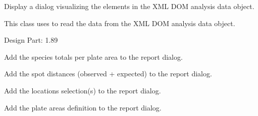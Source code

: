 \documentclass[letterpaper,10pt,english]{sphinxmanual}
\begin{document}
\begin{fulllineitems}
\label{setlyze/gui:setlyze.gui.DisplayReport}
Display a dialog visualizing the elements in the XML DOM analysis
data object.

This class uses {\hyperref[setlyze/std:setlyze.std.ReportReader]{}} to read the data
from the XML DOM analysis data object.

Design Part: 1.89

\begin{fulllineitems}
\label{setlyze/gui:setlyze.gui.DisplayReport.add_area_totals}
Add the species totals per plate area to the report dialog.

\end{fulllineitems}


\begin{fulllineitems}
\label{setlyze/gui:setlyze.gui.DisplayReport.add_distances}
Add the spot distances (observed + expected) to the report
dialog.

\end{fulllineitems}


\begin{fulllineitems}
\label{setlyze/gui:setlyze.gui.DisplayReport.add_locations_selections}
Add the locations selection(s) to the report dialog.

\end{fulllineitems}


\begin{fulllineitems}
\label{setlyze/gui:setlyze.gui.DisplayReport.add_plate_areas_definition}
Add the plate areas definition to the report dialog.

\end{fulllineitems}



\end{fulllineitems}
\end{document}

